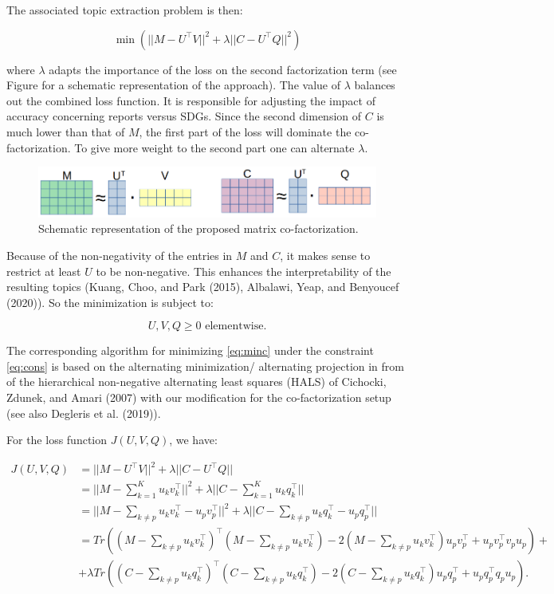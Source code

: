 \documentclass[
]{article}
\begin{document}
The associated topic extraction problem is then:

\begin{equation}\min(||M - U^\top V||^2 + \lambda ||C-U^\top Q||^2)\label{eq:minc}
\end{equation}

where \(\lambda\) adapts the importance of the loss on the second factorization term (see Figure for a schematic representation of the approach).
The value of \(\lambda\) balances out the combined loss function. It is responsible for adjusting the impact of accuracy concerning reports versus SDGs. Since the second dimension of \(C\) is much lower than that of \(M\), the first part of the loss will dominate the co-factorization. To give more weight to the second part one can alternate \(\lambda\).

\begin{figure}
\includegraphics[width=0.8\linewidth]{images/mf2} \caption{Schematic representation of the proposed matrix co-factorization.}\label{fig:unnamed-chunk-15}
\end{figure}

Because of the non-negativity of the entries in \(M\) and \(C\), it makes sense to restrict at least \(U\) to be non-negative. This enhances the interpretability of the resulting topics (Kuang, Choo, and Park (2015), Albalawi, Yeap, and Benyoucef (2020)). So the minimization is subject to:

\begin{equation}U, V,Q \geq 0 \text{ elementwise.}\label{eq:cons}
\end{equation}

The corresponding algorithm for minimizing \eqref{eq:minc} under the constraint \eqref{eq:cons} is based on the alternating minimization/ alternating projection in from of the hierarchical non-negative alternating least squares (HALS) of Cichocki, Zdunek, and Amari (2007) with our modification for the co-factorization setup (see also Degleris et al. (2019)).

For the loss function \(J(U,V,Q)\), we have:

\begin{align*}J(U,V,Q) &= ||M-U^\top V||^2 + \lambda ||C-U^\top Q|| \\
&= ||M-\sum_{k=1}^K u_kv_k^\top||^2 + \lambda ||C-\sum_{k=1}^K u_kq_k^\top||\\
&=||M-\sum_{k\not=p} u_kv_k^\top - u_pv_p^\top||^2 + \lambda ||C-\sum_{k\not=p} u_kq_k^\top - u_pq_p^\top||\\
&= Tr((M-\sum_{k\not=p} u_kv_k^\top)^\top (M-\sum_{k\not=p} u_kv_k^\top) - 2(M-\sum_{k\not=p} u_kv_k^\top)u_pv_p^\top + u_pv_p^\top v_p u_p) + \\
&+\lambda Tr((C-\sum_{k\not=p} u_kq_k^\top)^\top (C-\sum_{k\not=p} u_kq_k^\top) - 2(C-\sum_{k\not=p} u_kq_k^\top)u_pq_p^\top + u_pq_p^\top q_p u_p).
\end{align*}
\end{document}
